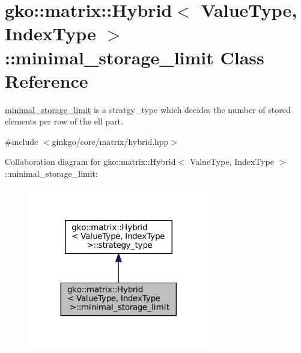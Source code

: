 \hypertarget{classgko_1_1matrix_1_1Hybrid_1_1minimal__storage__limit}{}\section{gko\+:\+:matrix\+:\+:Hybrid$<$ Value\+Type, Index\+Type $>$\+:\+:minimal\+\_\+storage\+\_\+limit Class Reference}
\label{classgko_1_1matrix_1_1Hybrid_1_1minimal__storage__limit}


\hyperlink{classgko_1_1matrix_1_1Hybrid_1_1minimal__storage__limit}{minimal\+\_\+storage\+\_\+limit} is a stratgy\+\_\+type which decides the number of stored elements per row of the ell part.  




{\ttfamily \#include $<$ginkgo/core/matrix/hybrid.\+hpp$>$}



Collaboration diagram for gko\+:\+:matrix\+:\+:Hybrid$<$ Value\+Type, Index\+Type $>$\+:\+:minimal\+\_\+storage\+\_\+limit\+:
\nopagebreak
\begin{figure}[H]
\begin{center}
\leavevmode
\includegraphics[width=224pt]{classgko_1_1matrix_1_1Hybrid_1_1minimal__storage__limit__coll__graph}
\end{center}
\end{figure}
